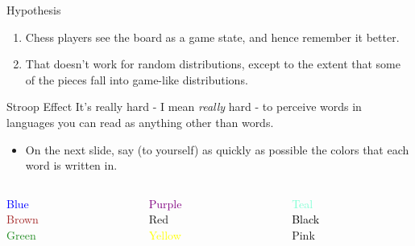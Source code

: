 \documentclass[
  17pt,
  letterpaper,
  ignorenonframetext,
  aspectratio=169,
  handout,
  xcolor={dvipsnames}]{beamer}
\providecommand{\tightlist}{%
  \setlength{\itemsep}{0pt}\setlength{\parskip}{0pt}}\usepackage{longtable,booktabs,array}
\begin{document}
\begin{frame}{Hypothesis}
\protect\hypertarget{hypothesis}{}
\begin{enumerate}[<+->]
\tightlist
\item
  Chess players see the board as a game state, and hence remember it
  better.
\item
  That doesn't work for random distributions, except to the extent that
  some of the pieces fall into game-like distributions.
\end{enumerate}
\end{frame}

\begin{frame}{Stroop Effect}
\protect\hypertarget{stroop-effect}{}
It's really hard - I mean \emph{really} hard - to perceive words in
languages you can read as anything other than words.

\begin{itemize}[<+->]
\tightlist
\item
  On the next slide, say (to yourself) as quickly as possible the colors
  that each word is written in.
\end{itemize}

\end{frame} \begin{frame}[plain]

\begin{columns}[T]
\begin{column}{0.25\textwidth}
\LARGE{ \textcolor{Blue}{Blue} \\ \textcolor{Brown}{Brown}  \\ \textcolor{ForestGreen}{Green} }
\end{column}

\begin{column}{0.25\textwidth}
\LARGE{  \textcolor{Purple}{Purple}    \\  \textcolor{BrickRed}{Red}    \\     \textcolor{Yellow}{Yellow} }
\end{column}

\begin{column}{0.25\textwidth}
\LARGE{  \textcolor{Aquamarine}{Teal} \\  \textcolor{Black}{Black} \\  \textcolor{Rhodamine}{Pink} }
\end{column}
\end{columns}

\end{frame} \begin{frame}[plain]


\end{frame}
\end{document}
